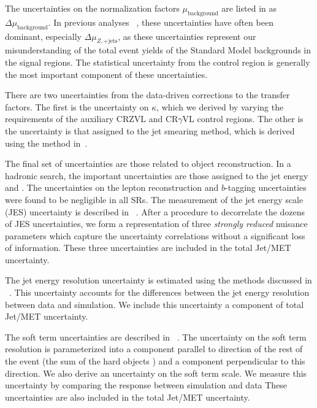 The uncertainties on the normalization factors $\mu_{\text{background}}$ are listed in  as $\Delta\mu_{\text{background}}$.
In previous analyses ~\cite{0-leptonPaper,0LPaper_13TeV}, these uncertainties have often been dominant, especially $\Delta\mu_{Z,\mathrm{+jets}}$, as these uncertainties represent our misunderstanding of the total event yields of the Standard Model backgrounds in the signal regions.
The statistical uncertainty from the control region is generally the most important component of these uncertainties.

There are two uncertainties from the data-driven corrections to the transfer factors.
The first is the uncertainty on $\kappa$, which we derived by varying the \met requirements of the auxiliary CRZVL and CR$\gamma$VL control regions.
The other is the uncertainty is that assigned to the jet smearing method, which is derived using the method in~\cite{SUSY-2011-20}.

The final set of uncertainties are those related to object reconstruction.
In a hadronic search, the important uncertainties are those assigned to the jet energy and \met.
The uncertainties on the lepton reconstruction and $b$-tagging uncertainties were found to be negligible in all SRs.
The measurement of the jet energy scale (JES) uncertainty is described in ~\cite{Aad:2011he,Aad:2012vm,ATL-PHYS-PUB-2015-014,ATL-PHYS-PUB-2015-015}.
After a procedure to decorrelate the dozens of JES uncertainties, we form a representation of three \textit{strongly reduced} nuisance parameters which capture the uncertainty correlations without a significant loss of information.
These three uncertainties are included in the total Jet/MET uncertainty.

The jet energy resolution uncertainty is estimated using the methods discussed in ~\cite{Aad:2012ag,ATL-PHYS-PUB-2015-015}.
This uncertainty accounts for the differences between the jet energy resolution between data and simulation.
We include this uncertainty a component of total Jet/MET uncertainty.

The \met soft term uncertainties are described in ~\cite{PERF-2014-04,ATL-PHYS-PUB-2015-023,ATL-PHYS-PUB-2015-027}.
The uncertainty on the \met soft term resolution is parameterized into a component parallel to direction of the rest of the event (the sum of the hard objects \pt) and a component perpendicular to this direction.
We also derive an uncertainty on the \met soft term scale.
We measure this uncertainty by comparing the \met response between simulation and data
These uncertainties are also included in the total Jet/MET uncertainty.

